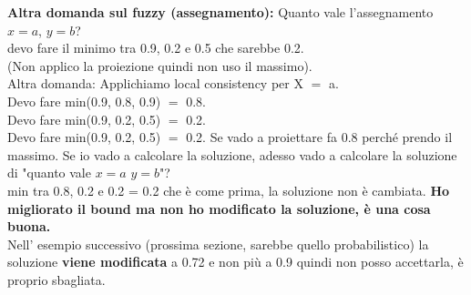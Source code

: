 \textbf{Altra domanda sul fuzzy (assegnamento): } Quanto vale l'assegnamento
$x=a$, $y=b$? \\devo fare il minimo tra 0.9, 0.2 e 0.5 che sarebbe 0.2. \\(Non
applico la proiezione quindi non uso il massimo). \\Altra domanda: Applichiamo
local consistency per X $=$ a. \\Devo fare min(0.9, 0.8, 0.9) $=$ 0.8. \\Devo
fare min(0.9, 0.2, 0.5) $=$ 0.2. \\Devo fare min(0.9, 0.2, 0.5) $=$ 0.2. Se vado
a proiettare fa 0.8 perché prendo il massimo. Se io vado a calcolare la
soluzione, adesso vado a calcolare la soluzione di "quanto vale $x=a$ $y=b$"?
\\min tra 0.8, 0.2 e 0.2 = 0.2 che è come prima, la soluzione non è cambiata.
\textbf{Ho migliorato il bound ma non ho modificato la soluzione, è una cosa buona.}
\\Nell' esempio successivo (prossima sezione, sarebbe quello probabilistico) la
soluzione \textbf{viene modificata} a 0.72 e non più a 0.9 quindi non posso
accettarla, è proprio sbagliata.
